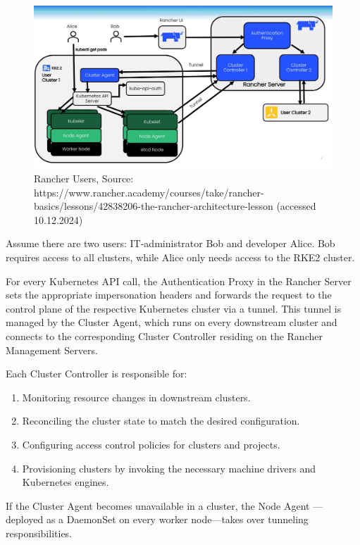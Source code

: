 \documentclass[../main.tex]{subfiles}
\begin{document}
\begin{figure}[H]
    \centering
    \includegraphics[scale=0.3]{img/2-background/rancher/rancher_users.png}
    \caption{Rancher Users, Source: https://www.rancher.academy/courses/take/rancher-basics/lessons/42838206-the-rancher-architecture-lesson (accessed 10.12.2024)}
    \label{fig:rancher_users}
\end{figure}

Assume there are two users: IT-administrator Bob and developer Alice. Bob requires access to all clusters, while Alice only needs access to the RKE2 cluster.

For every Kubernetes API call, the Authentication Proxy in the Rancher Server sets the appropriate impersonation headers and forwards the request to the control plane of the respective Kubernetes cluster via a tunnel. This tunnel is managed by the Cluster Agent, which runs on every downstream cluster and connects to the corresponding Cluster Controller residing on the Rancher Management Servers. 

Each Cluster Controller is responsible for:

\begin{enumerate}
    \item Monitoring resource changes in downstream clusters.
    \item Reconciling the cluster state to match the desired configuration.
    \item Configuring access control policies for clusters and projects.
    \item Provisioning clusters by invoking the necessary machine drivers and Kubernetes engines.
\end{enumerate}

If the Cluster Agent becomes unavailable in a cluster, the Node Agent — deployed as a DaemonSet on every worker node—takes over tunneling responsibilities.  
\end{document}
